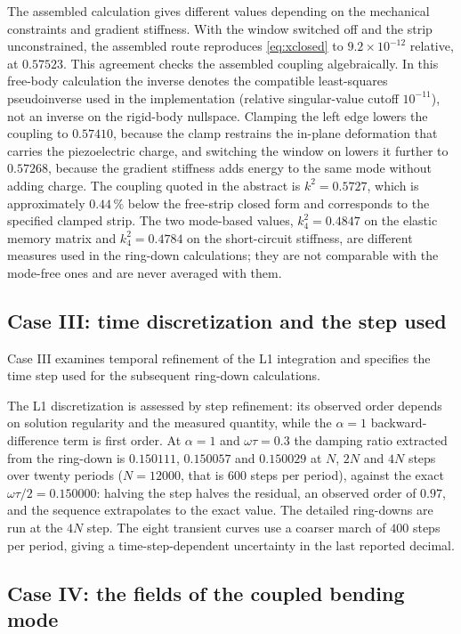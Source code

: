 The assembled calculation gives different values depending on the
mechanical constraints and gradient stiffness. With the window switched off and
the strip unconstrained, the assembled route reproduces \eqref{eq:xclosed} to
$9.2\times10^{-12}$ relative, at $0.57523$. This agreement checks the assembled coupling algebraically. In this free-body
calculation the inverse denotes the compatible least-squares pseudoinverse
used in the implementation (relative singular-value cutoff $10^{-11}$),
not an inverse on the rigid-body nullspace.
Clamping the left edge lowers the coupling to $0.57410$,
because the clamp restrains the in-plane deformation that carries the
piezoelectric charge, and switching the window on lowers it further to
$0.57268$, because the gradient stiffness adds energy to the same mode without
adding charge. The coupling quoted in the abstract is $k^{2}=0.5727$, which is approximately $0.44\,\%$ below the free-strip closed form and
corresponds to the specified clamped strip. The two mode-based values,
$k^2_4=0.4847$ on the elastic memory matrix and $k^2_4=0.4784$ on the
short-circuit stiffness, are different measures used in the ring-down calculations; they are not comparable
with the mode-free ones and are never averaged with them.

\subsection{Case III: time discretization and the step used}

Case III examines temporal refinement of the L1 integration and specifies
the time step used for the subsequent ring-down calculations.

The L1 discretization is assessed by step refinement: its observed order
depends on solution regularity and the measured quantity, while the
$\alpha=1$ backward-difference term is first order. At
$\alpha=1$ and $\omega\tau=0.3$ the damping ratio
extracted from the ring-down is $0.150111$, $0.150057$ and $0.150029$ at $N$,
$2N$ and $4N$ steps over twenty periods ($N=12000$, that is $600$ steps per
period), against the exact $\omega\tau/2=0.150000$: halving the step halves the
residual, an observed order of $0.97$, and the sequence extrapolates to the
exact value. The detailed ring-downs are run at the $4N$ step.
The eight transient curves use a coarser march of $400$
steps per period, giving a time-step-dependent uncertainty in the last reported decimal.

\subsection{Case IV: the fields of the coupled bending mode}

